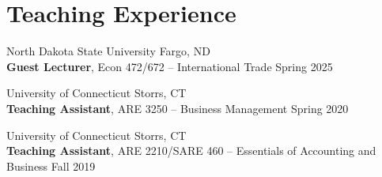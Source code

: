 \documentclass[10.5pt,letterpaper]{article}
\renewenvironment{itemize}{
	\begin{list}{}{
			\setlength{\leftmargin}{1.5em}
		}
	}{
	\end{list}
}
\begin{document}
	\section*{\textbf{Teaching Experience}}
	\begin{itemize}
		\item[-] North Dakota State University \hfill Fargo, ND \\
		\textbf{Guest Lecturer}, Econ 472/672 – International Trade \hfill Spring 2025
		
		\item[-] University of Connecticut \hfill Storrs, CT \\
		\textbf{Teaching Assistant}, ARE 3250 – Business Management \hfill Spring 2020
		
		\item[-] University of Connecticut \hfill Storrs, CT \\
		\textbf{Teaching Assistant}, ARE 2210/SARE 460 – Essentials of Accounting and Business \hfill Fall 2019
	\end{itemize}
	
\end{document}
